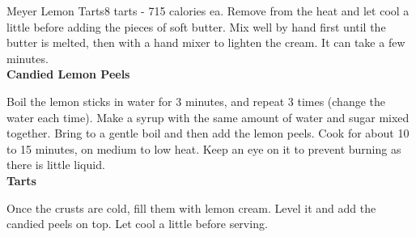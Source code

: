 \begin{recipe}{Meyer Lemon Tarts}{8 tarts - 715 calories ea.}{}
Remove from the heat and let cool a little before adding the pieces of soft butter. Mix well by hand first until the butter is melted, then with a hand mixer to lighten the cream. It can take a few minutes.\\

\textbf{Candied Lemon Peels}

Boil the lemon sticks in water for 3 minutes, and repeat 3 times (change the water each time). Make a syrup with the same amount of water and sugar mixed together. Bring to a gentle boil and then add the lemon peels. Cook for about 10 to 15 minutes, on medium to low heat. Keep an eye on it to prevent burning as there is little liquid.\\

\textbf{Tarts}

Once the crusts are cold, fill them with lemon cream. Level it and add the candied peels on top. Let cool a little before serving.

\end{recipe}